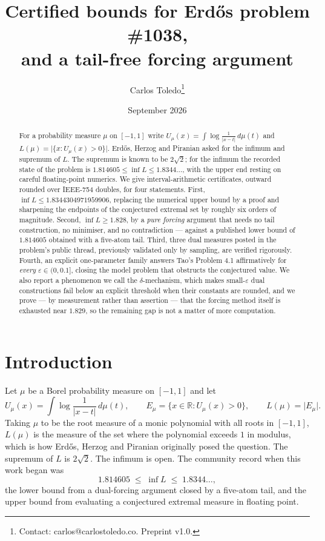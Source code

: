 \documentclass[11pt]{article}
\title{Certified bounds for Erd\H{o}s problem \#1038,\\
and a tail-free forcing argument}
\author{Carlos Toledo\thanks{Contact: carlos@carlostoledo.co.
Preprint v1.0. %
}}
\date{September 2026}
\newcommand{\R}{\mathbb{R}}
\begin{document}
\maketitle

\begin{abstract}
For a probability measure $\mu$ on $[-1,1]$ write
$U_\mu(x)=\int\log\frac{1}{|x-t|}\,d\mu(t)$ and
$L(\mu)=\lvert\{x: U_\mu(x)>0\}\rvert$. Erd\H{o}s, Herzog and Piranian
asked for the infimum and supremum of $L$. The supremum is known to be
$2\sqrt2$; for the infimum the recorded state of the problem is
$1.814605\le\inf L\le 1.8344\ldots$, with the upper end resting on
careful floating-point numerics. We give interval-arithmetic
certificates, outward rounded over IEEE-754 doubles, for four
statements. First, $\inf L\le 1.8344304971959906$, replacing the
numerical upper bound by a proof and sharpening the endpoints of the
conjectured extremal set by roughly six orders of magnitude. Second,
$\inf L\ge 1.828$, by a \emph{pure forcing} argument that needs no tail
construction, no minimiser, and no contradiction --- against a published
lower bound of $1.814605$ obtained with a five-atom tail. Third, three
dual measures posted in the problem's public thread, previously
validated only by sampling, are verified rigorously. Fourth, an explicit
one-parameter family answers Tao's Problem 4.1 affirmatively for
\emph{every} $\varepsilon\in(0,0.1]$, closing the model problem that
obstructs the conjectured value. We also report a phenomenon we call the
$\delta$-mechanism, which makes small-$\varepsilon$ dual constructions
fail below an explicit threshold when their constants are rounded, and
we prove --- by measurement rather than assertion --- that the forcing
method itself is exhausted near $1.829$, so the remaining gap is not a
matter of more computation.
\end{abstract}

\section{Introduction}

Let $\mu$ be a Borel probability measure on $[-1,1]$ and let
\[
  U_\mu(x)=\int \log\frac{1}{|x-t|}\,d\mu(t),
  \qquad
  E_\mu=\{x\in\R: U_\mu(x)>0\},
  \qquad
  L(\mu)=\lvert E_\mu\rvert .
\]
Taking $\mu$ to be the root measure of a monic polynomial with all roots
in $[-1,1]$, $L(\mu)$ is the measure of the set where the polynomial
exceeds $1$ in modulus, which is how Erd\H{o}s, Herzog and Piranian
originally posed the question. The supremum of $L$ is $2\sqrt2$. The
infimum is open. The community record when this work began was
\[
  1.814605 \;\le\; \inf L \;\le\; 1.8344\ldots,
\]
the lower bound from a dual-forcing argument closed by a five-atom tail,
and the upper bound from evaluating a conjectured extremal measure in
floating point.
\end{document}
